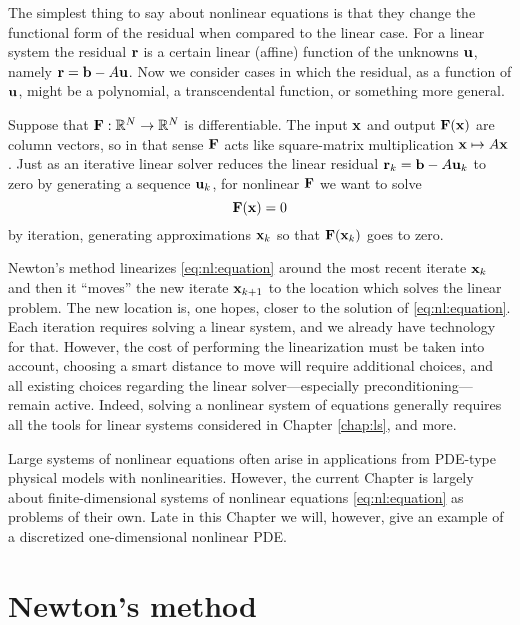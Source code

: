 
The simplest thing to say about nonlinear equations is that they change the functional form of the residual when compared to the linear case.  For a linear system the residual $\mathbf{r}$ is a certain linear (affine) function of the unknowns $\mathbf{u}$, namely $\mathbf{r} = \mathbf{b} - A \mathbf{u}$.  Now we consider cases in which the residual, as a function of $\mathbf{u}$, might be a polynomial, a transcendental function, or something more general.

Suppose that $\mathbf{F} : \mathbb{R}^N \to \mathbb{R}^N$ is differentiable.  The input $\mathbf{x}$ and output $\mathbf{F}(\mathbf{x})$ are column vectors, so in that sense $\mathbf{F}$ acts like square-matrix multiplication $\mathbf{x}\mapsto A\mathbf{x}$.  Just as an iterative linear solver reduces the linear residual $\mathbf{r}_k=\mathbf{b} - A \mathbf{u}_k$ to zero by generating a sequence $\mathbf{u}_k$, for nonlinear $\mathbf{F}$ we want to solve
\begin{equation}
   \mathbf{F}(\mathbf{x}) = 0   \label{eq:nl:equation}
\end{equation}
by iteration, generating approximations $\mathbf{x}_k$ so that $\mathbf{F}(\mathbf{x}_k)$ goes to zero.

Newton's method linearizes \eqref{eq:nl:equation} around the most recent iterate $\mathbf{x}_k$ and then it ``moves'' the new iterate $\mathbf{x}_{k+1}$ to the location which solves the linear problem.  The new location is, one hopes, closer to the solution of \eqref{eq:nl:equation}.  Each iteration requires solving a linear system, and we already have \PETSc technology for that.  However, the cost of performing the linearization must be taken into account, choosing a smart distance to move will require additional choices, and all existing choices regarding the linear solver---especially preconditioning---remain active.  Indeed, solving a nonlinear system of equations generally requires all the tools for linear systems considered in Chapter \ref{chap:ls}, and more.

Large systems of nonlinear equations often arise in applications from PDE-type physical models with nonlinearities.  However, the current Chapter is largely about finite-dimensional systems of nonlinear equations \eqref{eq:nl:equation} as problems of their own.  Late in this Chapter we will, however, give an example of a discretized one-dimensional nonlinear PDE.


\section{Newton's method}

